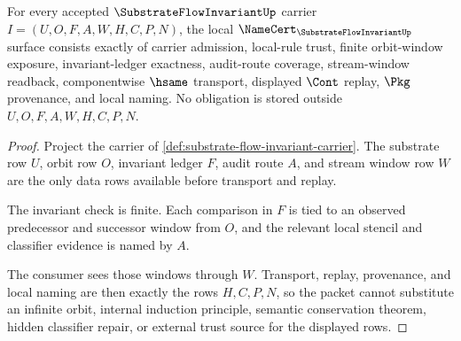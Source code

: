 \begin{theorem}
\label{thm:substrate-flow-invariant-namecert-obligations}
For every accepted $\SubstrateFlowInvariantUp$ carrier $I=(U,O,F,A,W,H,C,P,N)$, the local $\NameCert_{\SubstrateFlowInvariantUp}$ surface consists exactly of carrier admission, local-rule trust, finite orbit-window exposure, invariant-ledger exactness, audit-route coverage, stream-window readback, componentwise $\hsame$ transport, displayed $\Cont$ replay, $\Pkg$ provenance, and local naming. No obligation is stored outside $U,O,F,A,W,H,C,P,N$.
\end{theorem}
\begin{proof}
Project the carrier of \autoref{def:substrate-flow-invariant-carrier}. The substrate row $U$, orbit row $O$, invariant ledger $F$, audit route $A$, and stream window row $W$ are the only data rows available before transport and replay.

The invariant check is finite. Each comparison in $F$ is tied to an observed predecessor and successor window from $O$, and the relevant local stencil and classifier evidence is named by $A$.

The consumer sees those windows through $W$. Transport, replay, provenance, and local naming are then exactly the rows $H,C,P,N$, so the packet cannot substitute an infinite orbit, internal induction principle, semantic conservation theorem, hidden classifier repair, or external trust source for the displayed rows.
\end{proof}



